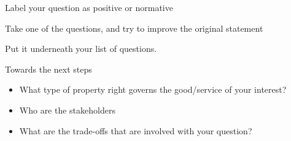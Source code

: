 \begin{frame}{Label your question as positive or normative}
\protect\hypertarget{label-your-question-as-positive-or-normative}{}

\end{frame}

\begin{frame}{Take one of the questions, and try to improve the original
statement}
\protect\hypertarget{take-one-of-the-questions-and-try-to-improve-the-original-statement}{}

Put it underneath your list of questions.

\end{frame}

\begin{frame}{Towards the next steps}
\protect\hypertarget{towards-the-next-steps}{}

\begin{itemize}
\tightlist
\item
  What type of property right governs the good/service of your interest?
\item
  Who are the stakeholders
\item
  What are the trade-offs that are involved with your question?
\end{itemize}

\end{frame}
